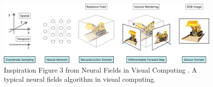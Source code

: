 \begin{figure}[!h]
    \centering
    \includegraphics[width=1.0\textwidth]{figures/neural-field.png}
    \caption[A typical neural fields algorithm in visual computing.]{Inspiration Figure 3 from Neural Fields in Visual Computing \cite{xie_neural_2022}. A typical neural fields algorithm in visual computing.}
    \label{fig:neural-field}
\end{figure}